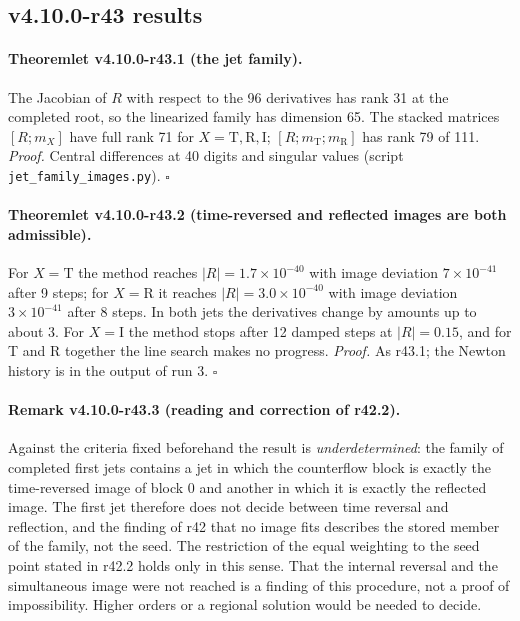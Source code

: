 \subsection*{v4.10.0-r43 results}
\label{subsec:v4100-r43-results}

\paragraph{Theoremlet v4.10.0-r43.1 (the jet family).}
The Jacobian of \(R\) with respect to the 96 derivatives has rank 31 at the completed root, so the linearized family has dimension 65.  The stacked
matrices \([R;m_X]\) have full rank 71 for \(X=\mathrm T,\mathrm R,\mathrm I\); \([R;m_{\mathrm T};m_{\mathrm R}]\) has rank 79 of 111.
\emph{Proof.} Central differences at 40 digits and singular values (script \texttt{jet\_\allowbreak family\_\allowbreak images.py}).  \(\square\)

\paragraph{Theoremlet v4.10.0-r43.2 (time-reversed and reflected images are both admissible).}
For \(X=\mathrm T\) the method reaches \(|R|=1.7\times10^{-40}\) with image deviation \(7\times10^{-41}\) after 9 steps; for \(X=\mathrm R\) it reaches \(|R|=3.0\times10^{-40}\) with
image deviation \(3\times10^{-41}\) after 8 steps.  In both jets the derivatives change by amounts up to about 3.  For \(X=\mathrm I\) the method stops after
12 damped steps at \(|R|=0.15\), and for T and R together the line search makes no progress.
\emph{Proof.} As r43.1; the Newton history is in the output of run 3.  \(\square\)

\paragraph{Remark v4.10.0-r43.3 (reading and correction of r42.2).}
Against the criteria fixed beforehand the result is \emph{underdetermined}: the family of completed first jets contains a jet in which the
counterflow block is exactly the time-reversed image of block 0 and another in which it is exactly the reflected image.  The first jet therefore
does not decide between time reversal and reflection, and the finding of r42 that no image fits describes the stored member of the family,
not the seed.  The restriction of the equal weighting to the seed point stated in r42.2 holds only in this sense.  That the internal reversal
and the simultaneous image were not reached is a finding of this procedure, not a proof of impossibility.  Higher orders or a regional
solution would be needed to decide.

